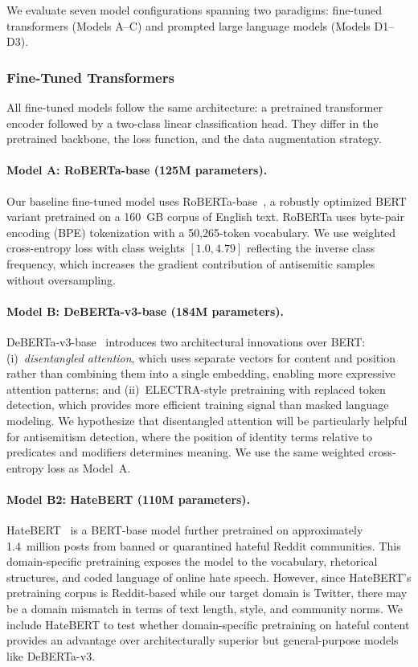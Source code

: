\documentclass[10pt,a4paper]{article}
\newcommand{\modelA}{RoBERTa-base}
\newcommand{\modelB}{DeBERTa-v3-base}
\newcommand{\modelBB}{HateBERT}
\begin{document}
We evaluate seven model configurations spanning two paradigms: fine-tuned transformers (Models A--C) and prompted large language models (Models D1--D3).

\subsubsection{Fine-Tuned Transformers}

All fine-tuned models follow the same architecture: a pretrained transformer encoder followed by a two-class linear classification head. They differ in the pretrained backbone, the loss function, and the data augmentation strategy.

\paragraph{Model A: RoBERTa-base (125M parameters).}
Our baseline fine-tuned model uses \modelA{}~\citep{liu2019roberta}, a robustly optimized BERT variant pretrained on a 160~GB corpus of English text. RoBERTa uses byte-pair encoding (BPE) tokenization with a 50,265-token vocabulary. We use weighted cross-entropy loss with class weights $[1.0, 4.79]$ reflecting the inverse class frequency, which increases the gradient contribution of antisemitic samples without oversampling.

\paragraph{Model B: DeBERTa-v3-base (184M parameters).}
\modelB{}~\citep{he2023debertav3} introduces two architectural innovations over BERT: (i)~\emph{disentangled attention}, which uses separate vectors for content and position rather than combining them into a single embedding, enabling more expressive attention patterns; and (ii)~ELECTRA-style pretraining with replaced token detection, which provides more efficient training signal than masked language modeling. We hypothesize that disentangled attention will be particularly helpful for antisemitism detection, where the position of identity terms relative to predicates and modifiers determines meaning. We use the same weighted cross-entropy loss as Model~A.

\paragraph{Model B2: HateBERT (110M parameters).}
\modelBB{}~\citep{caselli2021hatebert} is a BERT-base model further pretrained on approximately 1.4~million posts from banned or quarantined hateful Reddit communities. This domain-specific pretraining exposes the model to the vocabulary, rhetorical structures, and coded language of online hate speech. However, since HateBERT's pretraining corpus is Reddit-based while our target domain is Twitter, there may be a domain mismatch in terms of text length, style, and community norms. We include HateBERT to test whether domain-specific pretraining on hateful content provides an advantage over architecturally superior but general-purpose models like DeBERTa-v3.
\end{document}
